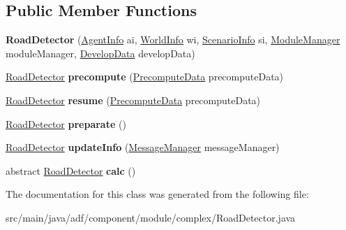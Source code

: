 \subsection*{Public Member Functions}
\begin{DoxyCompactItemize}
\item 
\hypertarget{classadf_1_1component_1_1module_1_1complex_1_1RoadDetector_a54fe9e9c6e2e3b9cfef54114b000ae66}{}\label{classadf_1_1component_1_1module_1_1complex_1_1RoadDetector_a54fe9e9c6e2e3b9cfef54114b000ae66} 
{\bfseries Road\+Detector} (\hyperlink{classadf_1_1agent_1_1info_1_1AgentInfo}{Agent\+Info} ai, \hyperlink{classadf_1_1agent_1_1info_1_1WorldInfo}{World\+Info} wi, \hyperlink{classadf_1_1agent_1_1info_1_1ScenarioInfo}{Scenario\+Info} si, \hyperlink{classadf_1_1agent_1_1module_1_1ModuleManager}{Module\+Manager} module\+Manager, \hyperlink{classadf_1_1agent_1_1develop_1_1DevelopData}{Develop\+Data} develop\+Data)
\item 
\hypertarget{classadf_1_1component_1_1module_1_1complex_1_1RoadDetector_afb3b34a57a81e1bbc8757d767955c6db}{}\label{classadf_1_1component_1_1module_1_1complex_1_1RoadDetector_afb3b34a57a81e1bbc8757d767955c6db} 
\hyperlink{classadf_1_1component_1_1module_1_1complex_1_1RoadDetector}{Road\+Detector} {\bfseries precompute} (\hyperlink{classadf_1_1agent_1_1precompute_1_1PrecomputeData}{Precompute\+Data} precompute\+Data)
\item 
\hypertarget{classadf_1_1component_1_1module_1_1complex_1_1RoadDetector_ad1146b1b1d106c8b56035e3552a943f4}{}\label{classadf_1_1component_1_1module_1_1complex_1_1RoadDetector_ad1146b1b1d106c8b56035e3552a943f4} 
\hyperlink{classadf_1_1component_1_1module_1_1complex_1_1RoadDetector}{Road\+Detector} {\bfseries resume} (\hyperlink{classadf_1_1agent_1_1precompute_1_1PrecomputeData}{Precompute\+Data} precompute\+Data)
\item 
\hypertarget{classadf_1_1component_1_1module_1_1complex_1_1RoadDetector_ae040aed23ecd46133e637ff6d09f7645}{}\label{classadf_1_1component_1_1module_1_1complex_1_1RoadDetector_ae040aed23ecd46133e637ff6d09f7645} 
\hyperlink{classadf_1_1component_1_1module_1_1complex_1_1RoadDetector}{Road\+Detector} {\bfseries preparate} ()
\item 
\hypertarget{classadf_1_1component_1_1module_1_1complex_1_1RoadDetector_ac15499fc352302ae284a0e5ddcfa1091}{}\label{classadf_1_1component_1_1module_1_1complex_1_1RoadDetector_ac15499fc352302ae284a0e5ddcfa1091} 
\hyperlink{classadf_1_1component_1_1module_1_1complex_1_1RoadDetector}{Road\+Detector} {\bfseries update\+Info} (\hyperlink{classadf_1_1agent_1_1communication_1_1MessageManager}{Message\+Manager} message\+Manager)
\item 
\hypertarget{classadf_1_1component_1_1module_1_1complex_1_1RoadDetector_ad572725af764bbffb9c48215f119ecf4}{}\label{classadf_1_1component_1_1module_1_1complex_1_1RoadDetector_ad572725af764bbffb9c48215f119ecf4} 
abstract \hyperlink{classadf_1_1component_1_1module_1_1complex_1_1RoadDetector}{Road\+Detector} {\bfseries calc} ()
\end{DoxyCompactItemize}


The documentation for this class was generated from the following file\+:\begin{DoxyCompactItemize}
\item 
src/main/java/adf/component/module/complex/Road\+Detector.\+java\end{DoxyCompactItemize}
